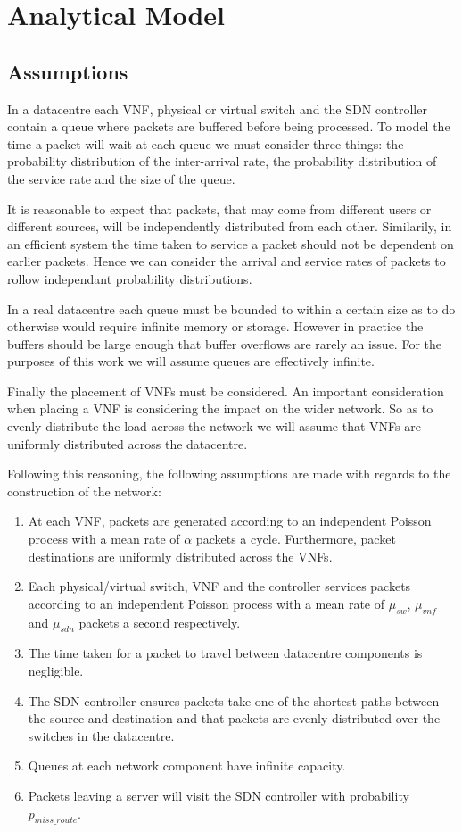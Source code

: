 
\section{Analytical Model}
\label{sec:analytical_model}
\subsection{Assumptions}
In a datacentre each VNF, physical or virtual switch and the SDN controller contain a queue where packets are buffered before being processed. To model the time a packet will wait at each queue we must consider three things: the probability distribution of the inter-arrival rate, the probability distribution of the service rate and the size of the queue.

It is reasonable to expect that packets, that may come from different users or different sources, will be independently distributed from each other. Similarily, in an efficient system the time taken to service a packet should not be dependent on earlier packets. Hence we can consider the arrival and service rates of packets to rollow independant probability distributions.

In a real datacentre each queue must be bounded to within a certain size as to do otherwise would require infinite memory or storage. However in practice the buffers should be large enough that buffer overflows are rarely an issue. For the purposes of this work we will assume queues are effectively infinite.

Finally the placement of VNFs must be considered. An important consideration when placing a VNF is considering the impact on the wider network. So as to evenly distribute the load across the network we will assume that VNFs are uniformly distributed across the datacentre.

Following this reasoning, the following assumptions are made with regards to the construction of the network:

\begin{enumerate}
\item At each VNF, packets are generated according to an independent Poisson process with a mean rate of $\alpha$ packets a cycle. Furthermore, packet destinations are uniformly distributed across the VNFs.
\item Each physical/virtual switch, VNF and the controller services packets according to an independent Poisson process with a mean rate of $\mu_{sw}$, $\mu_{vnf}$ and $\mu_{sdn}$ packets a second respectively.
\item The time taken for a packet to travel between datacentre components is negligible.
\item The SDN controller ensures packets take one of the shortest paths between the source and destination and that packets are evenly distributed over the switches in the datacentre.
\item Queues at each network component have infinite capacity.
\item Packets leaving a server will visit the SDN controller with probability $p_{miss\_route}$.
\end{enumerate}

